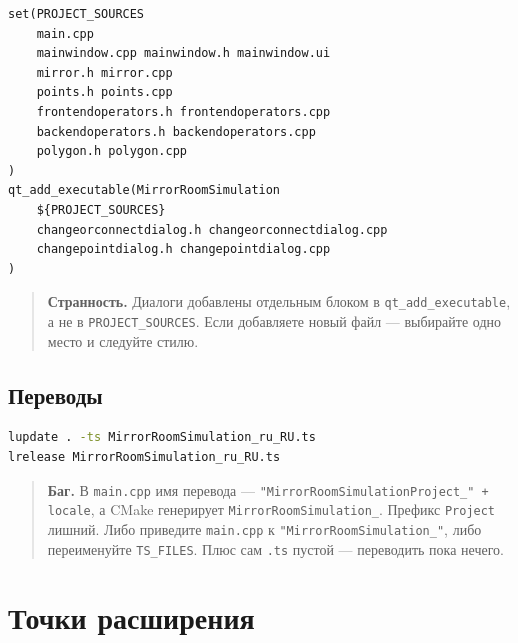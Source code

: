 \documentclass[a4paper,11pt]{article}
\newcommand{\file}[1]{\texttt{#1}}
\newcommand{\code}[1]{\texttt{#1}}
\begin{document}
\begin{lstlisting}[caption={CMakeLists.txt, фрагмент}]
set(PROJECT_SOURCES
    main.cpp
    mainwindow.cpp mainwindow.h mainwindow.ui
    mirror.h mirror.cpp
    points.h points.cpp
    frontendoperators.h frontendoperators.cpp
    backendoperators.h backendoperators.cpp
    polygon.h polygon.cpp
)
qt_add_executable(MirrorRoomSimulation
    ${PROJECT_SOURCES}
    changeorconnectdialog.h changeorconnectdialog.cpp
    changepointdialog.h changepointdialog.cpp
)
\end{lstlisting}

\begin{quote}
\textbf{Странность.} Диалоги добавлены отдельным блоком в
\code{qt\_add\_executable}, а не в \code{PROJECT\_SOURCES}. Если
добавляете новый файл — выбирайте одно место и следуйте стилю.
\end{quote}

\subsection{Переводы}

\begin{lstlisting}[language=bash]
lupdate . -ts MirrorRoomSimulation_ru_RU.ts
lrelease MirrorRoomSimulation_ru_RU.ts
\end{lstlisting}

\begin{quote}
\textbf{Баг.} В \file{main.cpp} имя перевода —
\code{"MirrorRoomSimulationProject\_" + locale}, а CMake генерирует
\code{MirrorRoomSimulation\_}. Префикс \code{Project} лишний.
Либо приведите \file{main.cpp} к \code{"MirrorRoomSimulation\_"},
либо переименуйте \code{TS\_FILES}. Плюс сам \file{.ts} пустой —
переводить пока нечего.
\end{quote}

\section{Точки расширения}
\label{sec:extending}
\end{document}

